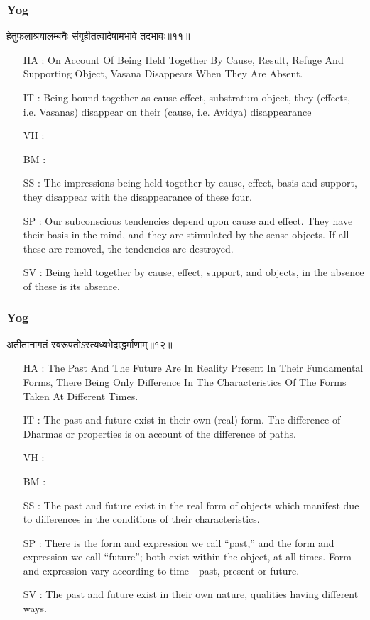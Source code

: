 \begin{frame}[fragile]\frametitle{Yog}
\begin{sanskrit}
हेतुफलाश्रयालम्बनैः संगृहीतत्वादेषामभावे तदभावः॥११॥
\end{sanskrit}

	\begin{itemize}
	\item [HA]: On Account Of Being Held Together By Cause, Result, Refuge And Supporting Object, Vasana Disappears When They Are Absent.
	\item [IT]: Being bound together as cause-effect, substratum-object, they (effects, i.e. Vasanas) disappear on their (cause, i.e. Avidya) disappearance
	\item [VH]: 
	\item [BM]: 
	\item [SS]: The impressions being held together by cause, effect, basis and support, they disappear with the disappearance of these four.
	\item [SP]: Our subconscious tendencies depend upon cause and effect. They have their basis in the mind, and they are stimulated by the sense-objects. If all these are removed, the tendencies are destroyed.
	\item [SV]: Being held together by cause, effect, support, and objects, in the absence of these is its absence. 
	\end{itemize}
\end{frame}


\begin{frame}[fragile]\frametitle{Yog}
\begin{sanskrit}
अतीतानागतं स्वरूपतोऽस्त्यध्वभेदाद्धर्माणाम्॥१२॥
\end{sanskrit}

	\begin{itemize}
	\item [HA]: The Past And The Future Are In Reality Present In Their Fundamental Forms, There Being Only Difference In The Characteristics Of The Forms Taken At Different Times.
	\item [IT]: The past and future exist in their own (real) form. The difference of Dharmas or properties is on account of the difference of paths.
	\item [VH]: 
	\item [BM]: 
	\item [SS]: The past and future exist in the real form of objects which manifest due to differences in the conditions of their characteristics.
	\item [SP]: There is the form and expression we call “past,” and the form and expression we call “future”; both exist within the object, at all times. Form and expression vary according to time—past, present or future.
	\item [SV]: The past and future exist in their own nature, qualities having different ways. 
	\end{itemize}
\end{frame}


